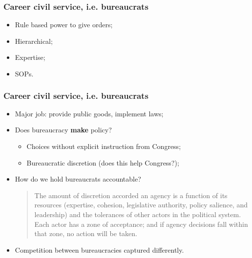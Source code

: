 \documentclass[aspectratio=169]{beamer}
\theoremstyle{principle}
\begin{document}
\begin{frame}
\frametitle{Career civil service, i.e. bureaucrats}
\begin{itemize}
\item Rule based power to give orders;
\bigskip
\item Hierarchical;
\bigskip
\item Expertise;
\bigskip
\item SOPs.
\end{itemize}
\end{frame}

\begin{frame}
\frametitle{Career civil service, i.e. bureaucrats}
\begin{itemize}
\item Major job: provide public goods, implement laws;
\bigskip
\item Does bureaucracy \textbf{make} policy?
\begin{itemize}
\item Choices without explicit instruction from Congress;
\item Bureaucratic discretion (does this help Congress?);
\end{itemize}
\bigskip
\item How do we hold bureaucrats accountable?
\begin{quote}
The amount of discretion accorded an agency is a function of its resources (expertise, cohesion, legislative authority, policy salience, and leadership) and the tolerances of other actors in the political system. Each actor has a zone of acceptance; and if agency decisions fall within that zone, no action will be taken.
\end{quote}
\item Competition between bureaucracies captured differently.
\end{itemize}
\end{frame}
\end{document}
